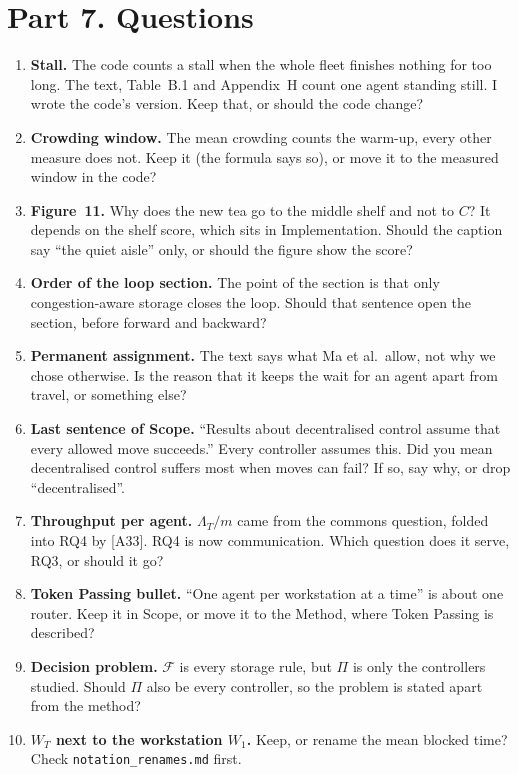 \documentclass[11pt,a4paper]{article}
\begin{document}
\section*{Part 7. Questions}
\begin{enumerate}
  \item \textbf{Stall.} The code counts a stall when the whole fleet finishes
        nothing for too long. The text, Table~B.1 and Appendix~H count one
        agent standing still. I wrote the code's version. Keep that, or should
        the code change?
  \item \textbf{Crowding window.} The mean crowding counts the warm-up, every
        other measure does not. Keep it (the formula says so), or move it to
        the measured window in the code?
  \item \textbf{Figure~11.} Why does the new tea go to the middle shelf and
        not to $C$? It depends on the shelf score, which sits in
        Implementation. Should the caption say ``the quiet aisle'' only, or
        should the figure show the score?
  \item \textbf{Order of the loop section.} The point of the section is that
        only congestion-aware storage closes the loop. Should that sentence
        open the section, before forward and backward?
  \item \textbf{Permanent assignment.} The text says what Ma et al.\ allow,
        not why we chose otherwise. Is the reason that it keeps the wait for
        an agent apart from travel, or something else?
  \item \textbf{Last sentence of Scope.} ``Results about decentralised
        control assume that every allowed move succeeds.'' Every controller
        assumes this. Did you mean decentralised control suffers most when
        moves can fail? If so, say why, or drop ``decentralised''.
  \item \textbf{Throughput per agent.} $\Lambda_T/m$ came from the commons
        question, folded into RQ4 by [A33]. RQ4 is now communication. Which
        question does it serve, RQ3, or should it go?
  \item \textbf{Token Passing bullet.} ``One agent per workstation at a time''
        is about one router. Keep it in Scope, or move it to the Method,
        where Token Passing is described?
  \item \textbf{Decision problem.} $\mathcal{F}$ is every storage rule, but
        $\Pi$ is only the controllers studied. Should $\Pi$ also be every
        controller, so the problem is stated apart from the method?
  \item \textbf{$W_T$ next to the workstation $W_1$.} Keep, or rename the mean
        blocked time? Check \texttt{notation\_renames.md} first.
\end{enumerate}
\end{document}

